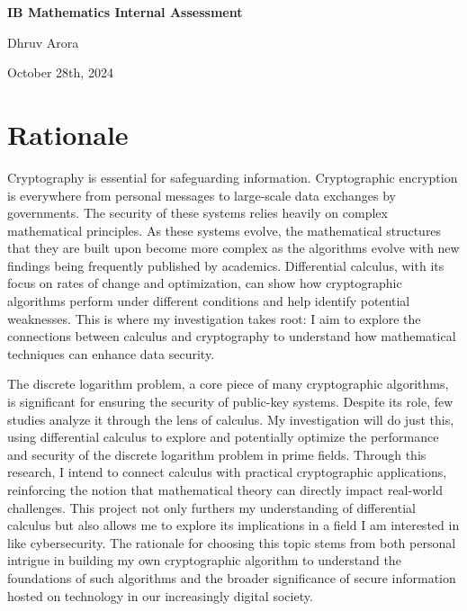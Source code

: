 \documentclass[12pt]{article}
\begin{document}
\begin{titlepage}
    \begin{center}
        \vspace*{1in}

        \Huge \textbf{IB Mathematics Internal Assessment} \\

        \vspace{0.5in}

        \Large Dhruv Arora \\

        \vspace{0.5in}

        October 28th, 2024

        \vspace{1.5in}
    \end{center}
\end{titlepage}

\newpage
\tableofcontents
\newpage

\section{Rationale}
Cryptography is essential for safeguarding information. Cryptographic encryption is everywhere from personal messages to large-scale data exchanges by governments. The security of these systems relies heavily on complex mathematical principles. As these systems evolve, the mathematical structures that they are built upon become more complex as the algorithms evolve with new findings being frequently published by academics. Differential calculus, with its focus on rates of change and optimization, can show how cryptographic algorithms perform under different conditions and help identify potential weaknesses. This is where my investigation takes root: I aim to explore the connections between calculus and cryptography to understand how mathematical techniques can enhance data security.

The discrete logarithm problem, a core piece of many cryptographic algorithms, is significant for ensuring the security of public-key systems. Despite its role, few studies analyze it through the lens of calculus. My investigation will do just this, using differential calculus to explore and potentially optimize the performance and security of the discrete logarithm problem in prime fields. Through this research, I intend to connect calculus with practical cryptographic applications, reinforcing the notion that mathematical theory can directly impact real-world challenges. This project not only furthers my understanding of differential calculus but also allows me to explore its implications in a field I am interested in like cybersecurity. The rationale for choosing this topic stems from both personal intrigue in building my own cryptographic algorithm to understand the foundations of such algorithms and the broader significance of secure information hosted on technology in our increasingly digital society.
\end{document}
